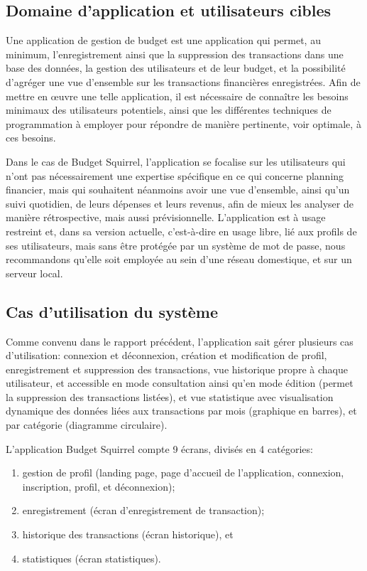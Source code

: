 \documentclass[a4paper,12pt]{article}
\begin{document}
\subsection{Domaine d'application et utilisateurs cibles}

Une application de gestion de budget est une application qui permet, au minimum, l'enregistrement ainsi que la suppression des transactions dans une base des données, la gestion des utilisateurs et de leur budget, et la possibilité d'agréger une vue d'ensemble sur les transactions financières enregistrées.
Afin de mettre en œuvre une telle application, il est nécessaire de connaître les besoins minimaux des utilisateurs potentiels, ainsi que les différentes techniques de programmation à employer pour répondre de manière pertinente, voir optimale, à ces besoins.

Dans le cas de Budget Squirrel, l'application se focalise sur les utilisateurs qui n’ont pas nécessairement une expertise spécifique en ce qui concerne planning financier, mais qui souhaitent néanmoins avoir une vue d’ensemble, ainsi qu’un suivi quotidien, de leurs dépenses et leurs revenus, afin de mieux les analyser de manière rétrospective, mais aussi prévisionnelle.
L'application est à usage restreint et, dans sa version actuelle, c'est-à-dire en usage libre, lié aux profils de ses utilisateurs, mais sans être protégée par un système de mot de passe, nous recommandons qu'elle soit employée au sein d'une réseau domestique, et sur un serveur local.

\subsection{Cas d'utilisation du système}

Comme convenu dans le rapport précédent, l'application sait gérer plusieurs cas d'utilisation: connexion et déconnexion, création et modification de profil, enregistrement et suppression des transactions, vue historique propre à chaque utilisateur, et accessible en mode consultation ainsi qu'en mode édition (permet la suppression des transactions listées), et vue statistique avec visualisation dynamique des données liées aux transactions par mois (graphique en barres), et par catégorie (diagramme circulaire).

L'application Budget Squirrel compte 9 écrans, divisés en 4 catégories:
\begin{enumerate}
\item gestion de profil (landing page, page d'accueil de l'application, connexion, inscription, profil, et déconnexion);
\item enregistrement (écran d'enregistrement de transaction);
\item historique des transactions (écran historique), et 
\item statistiques (écran statistiques).
\end{enumerate}
\end{document}
